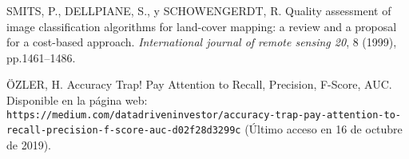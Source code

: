 \begin{thebibliography}{9}
 SMITS, P., DELLPIANE, S., y SCHOWENGERDT, R. Quality assessment of image classification algorithms for land-cover mapping: a review and a proposal for a cost-based approach. \textit{International journal of remote sensing 20}, 8 (1999), pp.1461–1486.


 \"{O}ZLER, H. Accuracy Trap! Pay Attention to Recall, Precision, F-Score, AUC. Disponible en la p\'{a}gina web: \texttt{https://medium.com/datadriveninvestor/accuracy-trap-pay-attention-to-recall-precision-f-score-auc-d02f28d3299c} (\'{U}ltimo acceso en 16 de octubre de 2019).

\end{thebibliography} 
